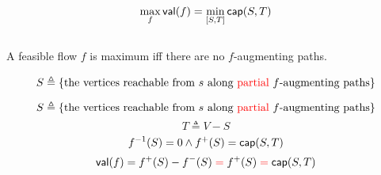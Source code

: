 \begin{frame}{}
  \begin{theorem}
    \[
      \max_{f} \textsf{val}(f) = \min_{[S, T]} \textsf{cap}(S, T)
    \]
    \begin{center}
    \end{center}
  \end{theorem}

  \begin{columns}
      \begin{center}
      \end{center}
      \begin{center}
      \end{center}
  \end{columns}
\end{frame}

\begin{frame}{}

  \pause
  \vspace{0.30cm}
\end{frame}

\begin{frame}{}
  \begin{theorem}
    A feasible flow $f$ is maximum iff there are no $f$-augmenting paths.
  \end{theorem}

  \pause
  \vspace{0.30cm}
  \begin{center}

    \pause
    \[
      S \triangleq \{\text{the vertices reachable from $s$
      along \textcolor{red}{partial} $f$-augmenting paths}\}
    \]
  \end{center}
\end{frame}

\begin{frame}{}
  \begin{center}
    \[
      S \triangleq \{\text{the vertices reachable from $s$
      along \textcolor{red}{partial} $f$-augmenting paths}\}
    \]
    \[
      T \triangleq V - S
    \]
    \pause
    \[
      f^{-1}(S) = 0 \land f^{+}(S) = \textsf{cap}(S, T)
    \]
    \pause
    \[
      \textsf{val}(f) = f^{+}(S) - f^{-}(S) \;\textcolor{red}{=}\; f^{+}(S) \;\textcolor{red}{=}\; \textsf{cap}(S, T)
    \]
  \end{center}
\end{frame}

